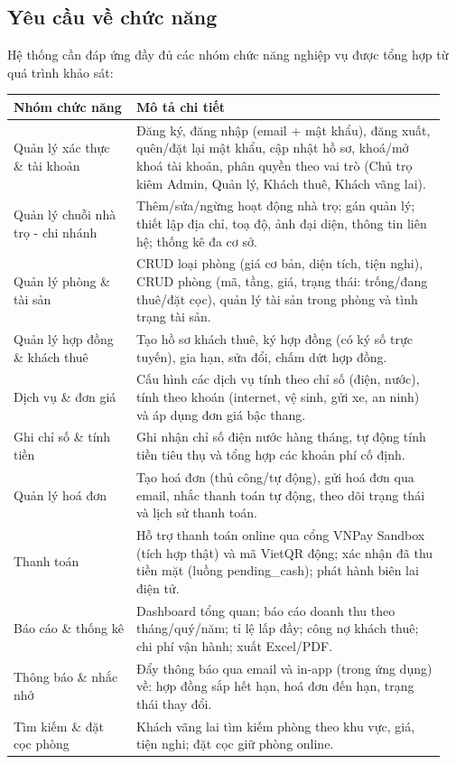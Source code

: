 \documentclass[a4paper,oneside]{report}
\begin{document}
\subsection{Yêu cầu về chức năng}

Hệ thống cần đáp ứng đầy đủ các nhóm chức năng nghiệp vụ được tổng hợp
từ quá trình khảo sát:

\begin{longtable}[]{@{}>{\RaggedRight\arraybackslash}p{0.27\linewidth}>{\RaggedRight\arraybackslash}p{0.68\linewidth}@{}}
\toprule
\textbf{Nhóm chức năng} & \textbf{Mô tả chi tiết}\tabularnewline
\midrule
\endhead
Quản lý xác thực \& tài khoản & Đăng ký, đăng nhập (email + mật khẩu),
đăng xuất, quên/đặt lại mật khẩu, cập nhật hồ sơ, khoá/mở khoá tài
khoản, phân quyền theo vai trò (Chủ trọ kiêm Admin, Quản lý, Khách thuê,
Khách vãng lai).\tabularnewline
Quản lý chuỗi nhà trọ - chi nhánh & Thêm/sửa/ngừng hoạt động nhà trọ;
gán quản lý; thiết lập địa chỉ, toạ độ, ảnh đại diện, thông tin liên hệ;
thống kê đa cơ sở.\tabularnewline
Quản lý phòng \& tài sản & CRUD loại phòng (giá cơ bản, diện tích, tiện
nghi), CRUD phòng (mã, tầng, giá, trạng thái: trống/đang thuê/đặt cọc),
quản lý tài sản trong phòng và tình trạng tài sản.\tabularnewline
Quản lý hợp đồng \& khách thuê & Tạo hồ sơ khách thuê, ký hợp đồng (có
ký số trực tuyến), gia hạn, sửa đổi, chấm dứt hợp đồng.\tabularnewline
Dịch vụ \& đơn giá & Cấu hình các dịch vụ tính theo chỉ số (điện, nước),
tính theo khoán (internet, vệ sinh, gửi xe, an ninh) và áp dụng đơn giá
bậc thang.\tabularnewline
Ghi chỉ số \& tính tiền & Ghi nhận chỉ số điện nước hàng tháng, tự động
tính tiền tiêu thụ và tổng hợp các khoản phí cố định.\tabularnewline
Quản lý hoá đơn & Tạo hoá đơn (thủ công/tự động), gửi hoá đơn qua email,
nhắc thanh toán tự động, theo dõi trạng thái và lịch sử thanh
toán.\tabularnewline
Thanh toán & Hỗ trợ thanh toán online qua cổng VNPay Sandbox (tích hợp
thật) và mã VietQR động; xác nhận đã thu tiền mặt (luồng pending\_cash);
phát hành biên lai điện tử.\tabularnewline
Báo cáo \& thống kê & Dashboard tổng quan; báo cáo doanh thu theo
tháng/quý/năm; tỉ lệ lấp đầy; công nợ khách thuê; chi phí vận hành; xuất
Excel/PDF.\tabularnewline
Thông báo \& nhắc nhở & Đẩy thông báo qua email và in-app (trong ứng
dụng) về: hợp đồng sắp hết hạn, hoá đơn đến hạn, trạng thái thay
đổi.\tabularnewline
Tìm kiếm \& đặt cọc phòng & Khách vãng lai tìm kiếm phòng theo khu vực,
giá, tiện nghi; đặt cọc giữ phòng online.\tabularnewline
\bottomrule
\end{longtable}
\end{document}
